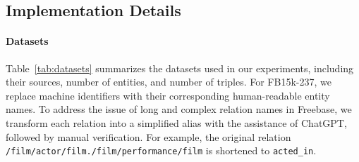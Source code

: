 \begin{table}[h]
\centering
\caption{Hyperparameter settings used across all experiments.}
\label{tab:hyperparameters}
\end{table}


\subsection{Implementation Details}\label{sec:implement_details}

\paragraph{Datasets} Table~\ref{tab:datasets} summarizes the datasets used in our experiments, including their sources, number of entities, and number of triples. 
For FB15k-237, we replace machine identifiers with their corresponding human-readable entity names. 
To address the issue of long and complex relation names in Freebase, we transform each relation into a simplified alias with the assistance of ChatGPT, followed by manual verification. 
For example, the original relation \texttt{/film/actor/film./film/performance/film} is shortened to \texttt{acted\_in}.



